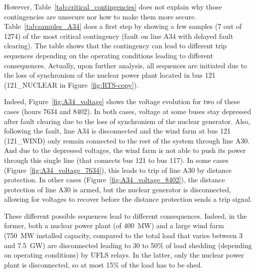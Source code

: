 {\begin{landscape}

\end{landscape}
\clearpage%
}


However, Table~\ref{tab:critical_contingencies} does not explain why those contingencies are unsecure nor how to make them more secure. Table~\ref{tab:samples_A34} does a first step by showing a few samples (7 out of 1274) of the most critical contingency (fault on line A34 with delayed fault clearing). The table shows that the contingency can lead to different trip sequences depending on the operating conditions leading to different consequences. Actually, upon further analysis, all sequences are initiated due to the loss of synchronism of the nuclear power plant located in bus 121 (121\_NUCLEAR in Figure~\ref{fig:RTS-copy}).

Indeed, Figure~\ref{fig:A34_voltage} shows the voltage evolution for two of these cases (hours 7634 and 8402). In both cases, voltage at some buses stay depressed after fault clearing due to the loss of synchronism of the nuclear generator. Also, following the fault, line A34 is disconnected and the wind farm at bus 121 (121\_WIND) only remain connected to the rest of the system through line A30. And due to the depressed voltages, the wind farm is not able to push its power through this single line (that connects bus 121 to bus 117). In some cases (\eg Figure~\ref{fig:A34_voltage_7634}), this leads to trip of line A30 by distance protection. In other cases (\eg Figure~\ref{fig:A34_voltage_8402}), the distance protection of line A30 is armed, but the nuclear generator is disconnected, allowing for voltages to recover before the distance protection sends a trip signal.

These different possible sequences lead to different consequences. Indeed, in the former, both a nuclear power plant (of 400~MW) and a large wind farm (750~MW installed capacity, compared to the total load that varies between 3 and 7.5~GW) are disconnected leading to 30 to 50\% of load shedding (depending on operating conditions) by UFLS relays. In the latter, only the nuclear power plant is disconnected, so at most 15\% of the load has to be shed.

